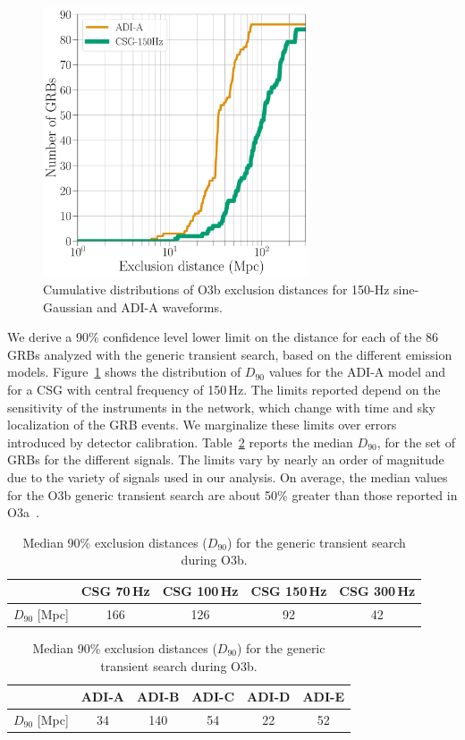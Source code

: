 \begin{figure}[h]
  \centering
  \includegraphics[width=0.7\textwidth]{figures/grb/o3b-x-exclusion.pdf}
  \caption{Cumulative distributions of O3b exclusion distances for 150-Hz sine-Gaussian and ADI-A waveforms.}
  \label{fig:grb-o3b-x-exclusion}
\end{figure}

We derive a 90\% confidence level lower limit on the distance for each of the 86 GRBs analyzed with the generic transient search, based on the different emission models.
Figure~\ref{fig:grb-o3b-x-exclusion} shows the distribution of $D_{90}$ values for the ADI-A model and for a CSG with central frequency of 150\,Hz.
The limits reported depend on the sensitivity of the instruments in the network, which change with time and sky localization of the GRB events.
We marginalize these limits over errors introduced by detector calibration.
Table~\ref{tab:grb-o3b-x-exclusion} reports the median $D_{90}$, for the set of GRBs for the different signals.
The limits vary by nearly an order of magnitude due to the variety of signals used in our analysis.
On average, the median values for the O3b generic transient search are about 50\% greater than those reported in O3a~\citep{grb_o3a}.

\begin{table}[h]
  \hspace{0.5cm}
  \caption
  {\label{tab:grb-o3b-x-exclusion} Median 90\% exclusion distances ($D_{90}$) for the generic transient search during O3b.}
  \begin{tabular}{c c c c c}
    \hline
    \hline
    \rule{0pt}{4ex}
    & CSG 70\,Hz & CSG 100\,Hz & CSG 150\,Hz & CSG 300\,Hz \\
    \hline
    \rule[-2ex]{0pt}{4ex}
    $D_{90}$ [Mpc] & 166 & 126 & 92 & 42
  \end{tabular}
  \begin{tabular}{c c c c c c}
    \hline
    \hline
    \rule{0pt}{4ex}
    & ADI-A & ADI-B & ADI-C & ADI-D & ADI-E \\
    \hline
    \rule[-2ex]{0pt}{4ex}
    $D_{90}$ [Mpc] & 34 & 140 & 54 & 22 & 52 \\
    \hline
  \end{tabular}
\end{table}


